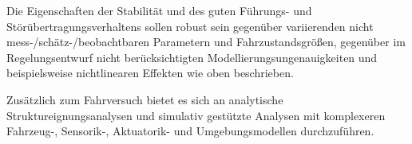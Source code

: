 Die Eigenschaften der Stabilität und des guten Führungs- und Störübertragungsverhaltens sollen robust sein gegenüber variierenden nicht mess-/schätz-/beobachtbaren Parametern und Fahrzustandsgrößen, gegenüber im Regelungsentwurf nicht berücksichtigten Modellierungsungenauigkeiten und beispielsweise nichtlinearen Effekten wie oben beschrieben.   


  
%
%
% 
%
% 
% 
% 
Zusätzlich zum Fahrversuch bietet es sich an analytische Struktureignungsanalysen und simulativ gestützte Analysen mit komplexeren Fahrzeug-, Sensorik-, Aktuatorik- und Umgebungsmodellen durchzuführen.
 
 
 

